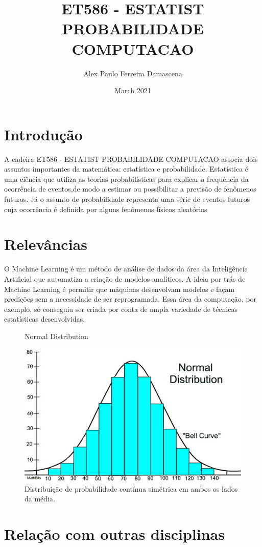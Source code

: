 \documentclass{article}
\title{ET586 - ESTATIST PROBABILIDADE COMPUTACAO }
\author{Alex Paulo Ferreira Damascena}
\date{March 2021}
\begin{document}
\maketitle

\section{Introdução}

\par A cadeira ET586 - ESTATIST PROBABILIDADE COMPUTACAO associa dois assuntos importantes da matemática: estatística e probabilidade. Estatística é uma ciência que utiliza as teorias probabilísticas para explicar a frequência da ocorrência de eventos,de modo a estimar ou possibilitar a previsão de fenômenos futuros. Já o assunto de probabilidade representa uma série de eventos futuros cuja ocorrência é definida por alguns fenômenos físicos aleatórios

\section{Relevâncias}

\par O Machine Learning é um método de análise de dados da área da Inteligência Artificial que automatiza a criação de modelos analíticos. A ideia por trás de Machine Learning é permitir que máquinas desenvolvam modelos e façam predições sem a necessidade de ser reprogramada. Essa área da computação, por exemplo, só conseguiu ser criada por conta de ampla variedade de técnicas estatísticas desenvolvidas.

\begin{figure}
\centering
\caption*{Normal Distribution}
  \centering
  \includegraphics[width=.4\linewidth]{normal.png}
\caption{Distribuição de probabilidade contínua simétrica em ambos os lados da média.}
\label{fig:test}
\end{figure}
  
\section{Relação com outras disciplinas}
\end{document}
